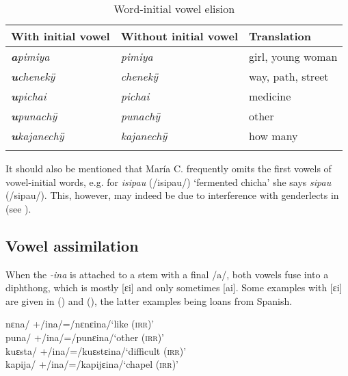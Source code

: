 \begin{table}
\caption{Word-initial vowel elision}

\begin{tabularx}{\textwidth}{QQl}
\lsptoprule
With initial vowel & Without initial vowel & Translation\\
\midrule
	\textit{\textbf{a}pimiya} & \textit{pimiya} & girl, young woman\\
	\textit{\textbf{u}chenekÿ} &  \textit{chenekÿ} & way, path, street\\
	\textit{\textbf{u}pichai} &  \textit{pichai} & medicine\\
	\textit{\textbf{u}punachÿ} & \textit{punachÿ} & other\\
	\textit{\textbf{u}kajanechÿ} & \textit{kajanechÿ} & how many\\
	
\lspbottomrule
\end{tabularx}

\label{tab:word-initialElision}
\end{table}


It should also be mentioned that María C. frequently omits the first vowels of vowel-initial words, e.g. for \textit{isipau} (/isipau/) ‘fermented chicha’ she says  \textit{sipau} (/sipau/). This, however, may indeed be due to interference with genderlects in  (see ). 

\subsection{Vowel assimilation} \label{par:Vassimilation} 

When the  \textit{-ina} is attached to a stem with a final /a/, both vowels fuse into a diphthong, which is mostly [ɛi] and only sometimes [ai]. Some examples with [ɛi] are given in () and (), the latter examples being loans from Spanish.

\ea\label{ex:Vass}
\ea\label{ex:Vass.1} 	\tab{/}nɛna/ \tab +\tab /ina/\tab =\tab /nɛnɛina/\tab ‘like (\textsc{irr})’\\
	\tab{/}puna/ \tab +\tab /ina/\tab =\tab /punɛina/\tab ‘other (\textsc{irr})’\\
\ex\label{ex:Vass.2} 	\tab{/}kuɛsta/ \tab +\tab /ina/\tab =\tab /kuɛstɛina/\tab ‘difficult (\textsc{irr})’\\
	\tab{/}kapija/ \tab +\tab /ina/\tab =\tab /kapijɛina/\tab ‘chapel (\textsc{irr})’\\
\z
\xe


